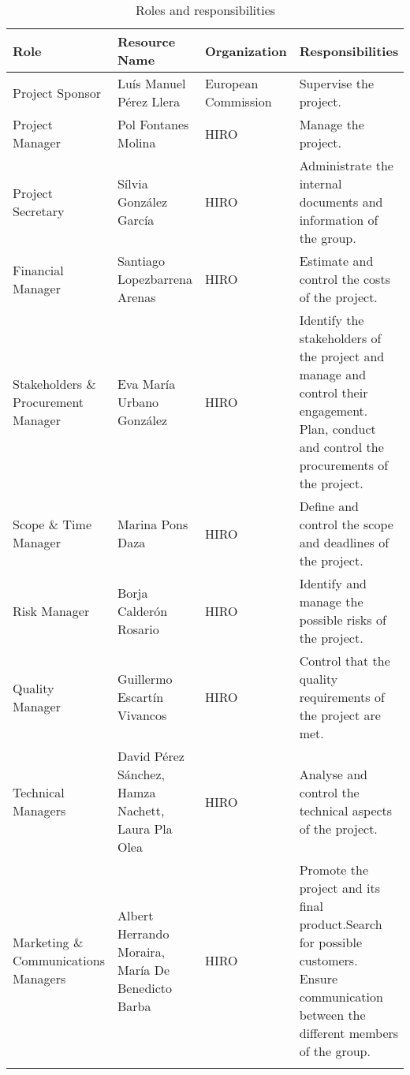 \begin{small}	
	
	\begin{longtable}{>{\raggedright\arraybackslash}p{2.5cm} >{\raggedright\arraybackslash}p{2.8cm} >{\raggedright\arraybackslash}p{2.6cm}>{\raggedright\arraybackslash}p{5.2cm}}
		
		\toprule[2pt]
		
		\textbf{Role} & \textbf{Resource Name} & \textbf{Organization} & \textbf{Responsibilities} 
		\\ \midrule[1.5pt] 
		\endhead
		
		Project Sponsor & Luís Manuel Pérez Llera & European Commission & Supervise the project. \\ \midrule
		
		Project Manager & Pol Fontanes Molina & HIRO & Manage the project. \\ \midrule
		
		Project Secretary & Sílvia González García & HIRO & Administrate the internal documents and information of the group. \\ \midrule
		
		Financial Manager & Santiago Lopezbarrena Arenas & HIRO & Estimate and control the costs of the project. \\ \midrule
		
		Stakeholders \& Procurement Manager & Eva María Urbano González & HIRO & Identify the stakeholders of the project and manage and control their engagement.\newline 
		Plan, conduct and control the procurements of the project.\\ \midrule
		
		Scope \& Time Manager & Marina Pons Daza & HIRO & Define and control the scope and deadlines of the project. \\ \midrule
		
		Risk Manager & Borja Calderón Rosario & HIRO & Identify and manage the possible risks of the project. \\ \midrule
		
		Quality Manager & Guillermo Escartín Vivancos & HIRO & Control that the quality requirements of the project are met. \\ \midrule
		
		Technical Managers & David Pérez Sánchez, \newline  Hamza Nachett, \newline  Laura Pla Olea & HIRO & Analyse and control the technical aspects of the project. \\ \midrule
		
		Marketing \& Communications Managers & Albert Herrando Moraira, \newline  María De Benedicto Barba & HIRO & Promote the project and its final product.\newline Search for possible customers.\newline 
		Ensure communication between the different members of the group.
		\\ \bottomrule[2pt]
		\caption{Roles and responsibilities}
		\label{table_roles}	
	\end{longtable}
\end{small}

